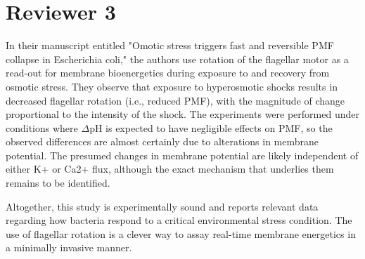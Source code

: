 \documentclass[11pt, letterpaper]{article}%
\begin{document}
\section*{Reviewer 3} In their manuscript entitled "Omotic stress triggers fast and reversible PMF collapse in Escherichia coli," the authors use rotation of the flagellar motor as a read-out for membrane bioenergetics during exposure to and recovery from osmotic stress. They observe that exposure to hyperosmotic shocks results in decreased flagellar rotation (i.e., reduced PMF), with the magnitude of change proportional to the intensity of the shock. The experiments were performed under conditions where $\Delta$pH is expected to have negligible effects on PMF, so the observed differences are almost certainly due to alterations in membrane potential. The presumed changes in membrane potential are likely independent of either K+ or Ca2+ flux, although the exact mechanism that underlies them remains to be identified.

Altogether, this study is experimentally sound and reports relevant data regarding how bacteria respond to a critical environmental stress condition. The use of flagellar rotation is a clever way to assay real-time membrane energetics in a minimally invasive manner.
\end{document}

